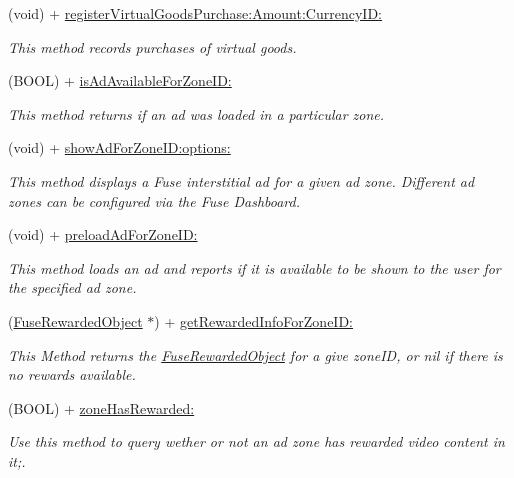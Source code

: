 \begin{DoxyCompactItemize}
(void) + \hyperlink{interface_fuse_s_d_k_abd1bc1b2e677978fb0e559cd9f7a72a9}{register\+Virtual\+Goods\+Purchase\+:\+Amount\+:\+Currency\+I\+D\+:}
\begin{DoxyCompactList}\small\item\em This method records purchases of virtual goods. \end{DoxyCompactList}\item 
(B\+O\+O\+L) + \hyperlink{interface_fuse_s_d_k_abdf624c4ef56ee1c7cac73b37dc4f5fd}{is\+Ad\+Available\+For\+Zone\+I\+D\+:}
\begin{DoxyCompactList}\small\item\em This method returns if an ad was loaded in a particular zone. \end{DoxyCompactList}\item 
(void) + \hyperlink{interface_fuse_s_d_k_aba0c488866771c47887ac847c2cd884e}{show\+Ad\+For\+Zone\+I\+D\+:options\+:}
\begin{DoxyCompactList}\small\item\em This method displays a Fuse interstitial ad for a given ad zone. Different ad zones can be configured via the Fuse Dashboard. \end{DoxyCompactList}\item 
(void) + \hyperlink{interface_fuse_s_d_k_a2e80d673366877a4bcfc6fe86031d526}{preload\+Ad\+For\+Zone\+I\+D\+:}
\begin{DoxyCompactList}\small\item\em This method loads an ad and reports if it is available to be shown to the user for the specified ad zone. \end{DoxyCompactList}\item 
(\hyperlink{interface_fuse_rewarded_object}{Fuse\+Rewarded\+Object} $\ast$) + \hyperlink{interface_fuse_s_d_k_a89958c6b87beffac157ac028e9e29df1}{get\+Rewarded\+Info\+For\+Zone\+I\+D\+:}
\begin{DoxyCompactList}\small\item\em This Method returns the \hyperlink{interface_fuse_rewarded_object}{Fuse\+Rewarded\+Object} for a give zone\+I\+D, or nil if there is no rewards available. \end{DoxyCompactList}\item 
(B\+O\+O\+L) + \hyperlink{interface_fuse_s_d_k_ad98a95cc63498dee7256258206808056}{zone\+Has\+Rewarded\+:}
\begin{DoxyCompactList}\small\item\em Use this method to query wether or not an ad zone has rewarded video content in it;. \end{DoxyCompactList}\item 

\end{DoxyCompactItemize}
